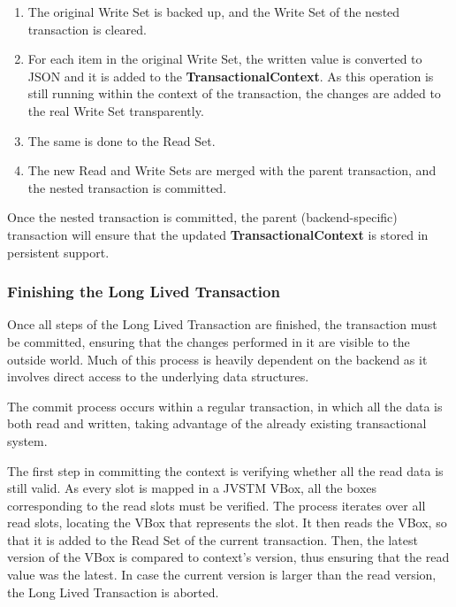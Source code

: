 \begin{enumerate}

\item The original Write Set is backed up, and the Write Set of the
  nested transaction is cleared.

\item For each item in the original Write Set, the written value is
  converted to JSON and it is added to the {\bf
    TransactionalContext}. As this operation is still running within
  the context of the transaction, the changes are added to the real
  Write Set transparently.

\item The same is done to the Read Set.

\item The new Read and Write Sets are merged with the parent
  transaction, and the nested transaction is committed.

\end{enumerate}

Once the nested transaction is committed, the parent
(backend-specific) transaction will ensure that the updated {\bf
  TransactionalContext} is stored in persistent support.

\subsubsection{Finishing the Long Lived Transaction}

Once all steps of the Long Lived Transaction are finished, the
transaction must be committed, ensuring that the changes performed in
it are visible to the outside world. Much of this process is heavily
dependent on the backend as it involves direct access to the
underlying data structures.

The commit process occurs within a regular transaction, in which all
the data is both read and written, taking advantage of the already
existing transactional system.

The first step in committing the context is verifying whether all the
read data is still valid. As every slot is mapped in a JVSTM VBox, all
the boxes corresponding to the read slots must be verified. The
process iterates over all read slots, locating the VBox that
represents the slot. It then reads the VBox, so that it is added to
the Read Set of the current transaction. Then, the latest version of
the VBox is compared to context's version, thus ensuring that the read
value was the latest. In case the current version is larger than the
read version, the Long Lived Transaction is aborted.

